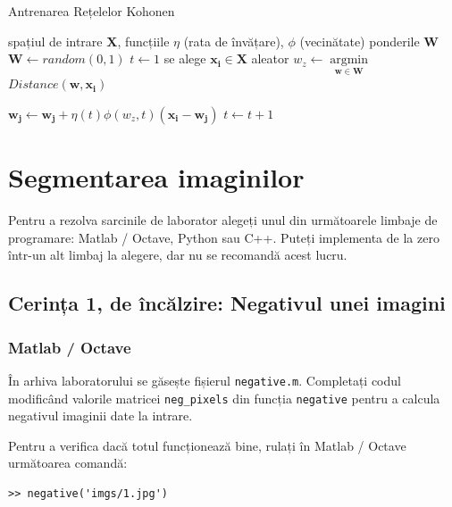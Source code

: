 \documentclass[12pt]{article}%
\newcommand{\mat}{{\color{brightmaroon} Matlab / Octave}}
\newcommand{\pyt}{{\color{cadmiumgreen} Python}}
\newcommand{\cc}{{\color{cobalt} C++}}
\begin{document}
\begin{algorithm}
  \caption{Antrenarea Rețelelor Kohonen}
  \begin{algorithmic}[1]
    \REQUIRE spațiul de intrare $\mathbf{X}$, funcțiile $\eta$ (rata
    de învățare), $\phi$ (vecinătate) \ENSURE ponderile $\mathbf{W}$
    \STATE $\mathbf{W} \longleftarrow random (0,1)$ \STATE $t
    \longleftarrow 1$ \REPEAT \STATE se alege $\mathbf{x_i} \in
    \mathbf{X}$ aleator \STATE $w_z \longleftarrow
    \underset{\mathbf{w} \in \mathbf{W}}{\operatorname{argmin}}$
    $Distance(\mathbf{w},\mathbf{x_i})$

     \STATE $\mathbf{w_j}
    \longleftarrow \mathbf{w_j} + \eta(t)
    \phi(w_z,t)(\mathbf{x_i}-\mathbf{w_j})$
    \ENDFOR
    \STATE $t \longleftarrow t + 1$ 
  \end{algorithmic}
  \label{alg:kohonen}
\end{algorithm}


\section{Segmentarea imaginilor}
\label{sec:tasks}

Pentru a rezolva sarcinile de laborator alegeți unul din următoarele
limbaje de programare: \mat, \pyt{ }sau \cc. Puteți implementa de la
zero într-un alt limbaj la alegere, dar nu se recomandă acest lucru.

\subsection{Cerința 1, de încălzire: Negativul unei imagini}
\label{sec:task1}

\subsubsection*{\mat}
\label{sec:mat1}

În arhiva laboratorului se găsește fișierul
\texttt{negative.m}. Completați codul modificând valorile matricei
\texttt{neg\_pixels} din funcția \texttt{negative} pentru a calcula
negativul imaginii date la intrare.

Pentru a verifica dacă totul funcționează bine, rulați în \mat{ }următoarea comandă:
\begin{verbatim}
>> negative('imgs/1.jpg')
\end{verbatim}
\end{document}
